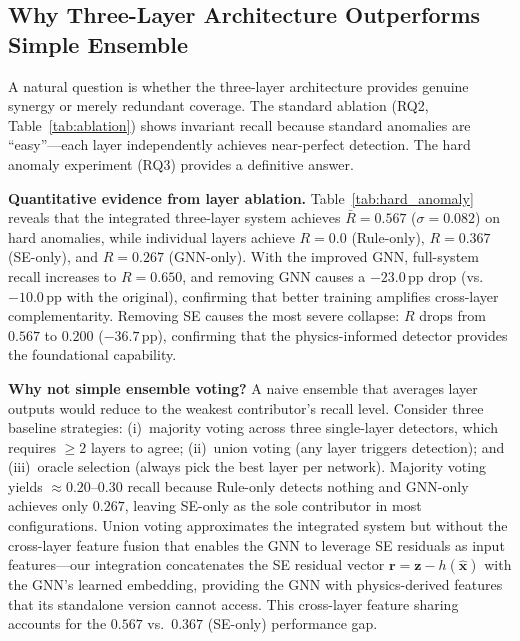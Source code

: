 \documentclass[research]{fcs}
\begin{document}
\subsection{Why Three-Layer Architecture Outperforms Simple Ensemble}

A natural question is whether the three-layer architecture provides genuine synergy or merely redundant coverage. The standard ablation (RQ2, Table~\ref{tab:ablation}) shows invariant recall because standard anomalies are ``easy''---each layer independently achieves near-perfect detection. The hard anomaly experiment (RQ3) provides a definitive answer.

\textbf{Quantitative evidence from layer ablation.} Table~\ref{tab:hard_anomaly} reveals that the integrated three-layer system achieves $\bar{R}=0.567$ ($\sigma=0.082$) on hard anomalies, while individual layers achieve $R=0.0$ (Rule-only), $R=0.367$ (SE-only), and $R=0.267$ (GNN-only). With the improved GNN, full-system recall increases to $R=0.650$, and removing GNN causes a $-23.0$\,pp drop (vs.\ $-10.0$\,pp with the original), confirming that better training amplifies cross-layer complementarity. Removing SE causes the most severe collapse: $R$ drops from $0.567$ to $0.200$ ($-36.7$\,pp), confirming that the physics-informed detector provides the foundational capability.

\textbf{Why not simple ensemble voting?} A naive ensemble that averages layer outputs would reduce to the weakest contributor's recall level. Consider three baseline strategies: (i)~majority voting across three single-layer detectors, which requires $\geq 2$ layers to agree; (ii)~union voting (any layer triggers detection); and (iii)~oracle selection (always pick the best layer per network). Majority voting yields $\approx 0.20$--$0.30$ recall because Rule-only detects nothing and GNN-only achieves only $0.267$, leaving SE-only as the sole contributor in most configurations. Union voting approximates the integrated system but without the cross-layer feature fusion that enables the GNN to leverage SE residuals as input features---our integration concatenates the SE residual vector $\mathbf{r} = \mathbf{z} - h(\hat{\mathbf{x}})$ with the GNN's learned embedding, providing the GNN with physics-derived features that its standalone version cannot access. This cross-layer feature sharing accounts for the $0.567$ vs.\ $0.367$ (SE-only) performance gap.
\end{document}

